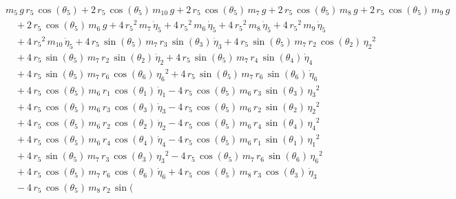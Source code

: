 \begin{eqnarray*} && m_{5}\,g\,r_{5}\,\cos({\theta_{5}}) + 2\,r_{5}\,
\cos({\theta_{5}})\,m_{10}\,g + 2\,r_{5}\,\cos({\theta_{5}})\,m_{7}\,g
 + 2\,r_{5}\,\cos({\theta_{5}})\,m_{8}\,g + 2\,r_{5}\,\cos({\theta_{5}
})\,m_{9}\,g \\ &&\quad\mbox{} + 2\,r_{5}\,\cos({\theta_{5}})\,m_{6}\,
g + 4\,{r_{5}}^2\,m_{7}\,{\dot{\eta}_{5}} + 4\,{r_{5}}^2\,m_{6}\,{
\dot{\eta}_{5}} + 4\,{r_{5}}^2\,m_{8}\,{\dot{\eta}_{5}} + 4\,{r_{5}}^2
\,m_{9}\,{\dot{\eta}_{5}} \\ &&\quad\mbox{} + 4\,{r_{5}}^2\,m_{10}\,{
\dot{\eta}_{5}} + 4\,r_{5}\,\sin({\theta_{5}})\,m_{7}\,r_{3}\,\sin({
\theta_{3}})\,{\dot{\eta}_{3}} + 4\,r_{5}\,\sin({\theta_{5}})\,m_{7}\,
r_{2}\,\cos({\theta_{2}})\,{{\eta_{2}}}^2 \\ &&\quad\mbox{} + 4\,r_{5}
\,\sin({\theta_{5}})\,m_{7}\,r_{2}\,\sin({\theta_{2}})\,{\dot{\eta}_{2
}} + 4\,r_{5}\,\sin({\theta_{5}})\,m_{7}\,r_{4}\,\sin({\theta_{4}})\,{
\dot{\eta}_{4}} \\ &&\quad\mbox{} + 4\,r_{5}\,\sin({\theta_{5}})\,m_{7
}\,r_{6}\,\cos({\theta_{6}})\,{{\eta_{6}}}^2 + 4\,r_{5}\,\sin({\theta
_{5}})\,m_{7}\,r_{6}\,\sin({\theta_{6}})\,{\dot{\eta}_{6}}
 \\ &&\quad\mbox{} + 4\,r_{5}\,\cos({\theta_{5}})\,m_{6}\,r_{1}\,\cos(
{\theta_{1}})\,{\dot{\eta}_{1}} - 4\,r_{5}\,\cos({\theta_{5}})\,m_{6}
\,r_{3}\,\sin({\theta_{3}})\,{{\eta_{3}}}^2 \\ &&\quad\mbox{} + 4\,r_{
5}\,\cos({\theta_{5}})\,m_{6}\,r_{3}\,\cos({\theta_{3}})\,{\dot{\eta}
_{3}} - 4\,r_{5}\,\cos({\theta_{5}})\,m_{6}\,r_{2}\,\sin({\theta_{2}})
\,{{\eta_{2}}}^2 \\ &&\quad\mbox{} + 4\,r_{5}\,\cos({\theta_{5}})\,m_{
6}\,r_{2}\,\cos({\theta_{2}})\,{\dot{\eta}_{2}} - 4\,r_{5}\,\cos({
\theta_{5}})\,m_{6}\,r_{4}\,\sin({\theta_{4}})\,{{\eta_{4}}}^2
 \\ &&\quad\mbox{} + 4\,r_{5}\,\cos({\theta_{5}})\,m_{6}\,r_{4}\,\cos(
{\theta_{4}})\,{\dot{\eta}_{4}} - 4\,r_{5}\,\cos({\theta_{5}})\,m_{6}
\,r_{1}\,\sin({\theta_{1}})\,{{\eta_{1}}}^2 \\ &&\quad\mbox{} + 4\,r_{
5}\,\sin({\theta_{5}})\,m_{7}\,r_{3}\,\cos({\theta_{3}})\,{{\eta_{3}}}
^2 - 4\,r_{5}\,\cos({\theta_{5}})\,m_{7}\,r_{6}\,\sin({\theta_{6}})\,{
{\eta_{6}}}^2 \\ &&\quad\mbox{} + 4\,r_{5}\,\cos({\theta_{5}})\,m_{7}
\,r_{6}\,\cos({\theta_{6}})\,{\dot{\eta}_{6}} + 4\,r_{5}\,\cos({\theta
_{5}})\,m_{8}\,r_{3}\,\cos({\theta_{3}})\,{\dot{\eta}_{3}}
 \\ &&\quad\mbox{} - 4\,r_{5}\,\cos({\theta_{5}})\,m_{8}\,r_{2}\,\sin(

\end{eqnarray*}
